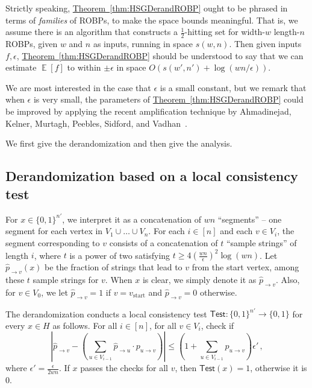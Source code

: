 \documentclass[11pt]{article}
\numberwithin{equation}{section}
\theoremstyle{definition}
\theoremstyle{plain}
\newcommand{\expref}[2]{\hyperref[#2]{#1~\ref{#2}}}
\DeclareMathOperator*{\ExpVal}{\mathbb{E}}
\begin{document}
Strictly speaking, \expref{Theorem}{thm:HSGDerandROBP} ought to be phrased in terms of \emph{families} of ROBPs, to make the space bounds meaningful. That is, we assume there is an algorithm that constructs a $\frac{1}{2}$-hitting set for width-$w$ length-$n$ ROBPs, given $w$ and $n$ as inputs, running in space $s(w, n)$. Then given inputs $f, \epsilon$, \expref{Theorem}{thm:HSGDerandROBP} should be understood to say that we can estimate $\ExpVal[f]$ to within $\pm \epsilon$ in space $O(s(w', n') + \log(wn/\epsilon))$.

We are most interested in the case that $\epsilon$ is a small constant, but we remark that when $\epsilon$ is very small, the parameters of \expref{Theorem}{thm:HSGDerandROBP} could be improved by applying the recent amplification technique by Ahmadinejad, Kelner, Murtagh, Peebles, Sidford, and Vadhan~\cite{AKMPSV20}.

We first give the derandomization and then give the analysis.

\subsection{Derandomization based on a local consistency test} 
\label{subsec:drandBPLgivenHS}

For $x\in \{0,1\}^{n'}$, we interpret it as a concatenation of $wn$ ``segments'' -- one segment for each vertex in $V_1 \cup \dots \cup V_n$. For each $i \in [n]$ and each $v \in V_i$, the segment corresponding to $v$ consists of a concatenation of $t$ ``sample strings'' of length $i$, where $t$ is a power of two satisfying $t \geq 4(\frac{wn }{\epsilon})^2 \log (wn)$. Let $\widehat{p}_{\to v}(x)$ be the fraction of strings that lead to $v$ from the start vertex, among  these $t$ sample strings for $v$. When $x$ is clear, we simply denote it as $\widehat{p}_{\to v}$. Also, for $v \in V_0$, we let $\widehat{p}_{\to v} = 1$ if $v = v_{\text{start}}$ and $\widehat{p}_{\to v} = 0$ otherwise.

The derandomization conducts a local consistency test $\mathsf{Test}:\{0,1\}^{n'} \to \{0,1\}$ for every $x \in H$ as follows. 
For all $i \in [n]$, for all $v \in V_i$,  check if 
\begin{equation} \label{ieq:lct}
\left|\widehat{p}_{\to v} -\left(  \sum_{u \in V_{i-1} } \widehat{p}_{\to u} \cdot p_{u \to v}  \right) \right| \leq \left( 1 + \sum_{u\in V_{i-1}}p_{u\to v} \right) \epsilon'\,,
\end{equation}   
where $\epsilon' = \frac{\epsilon}{2wn}$. If $x$ passes the checks for all $v$, then $\mathsf{Test}(x) = 1$, otherwise it is $0$.
\end{document}
